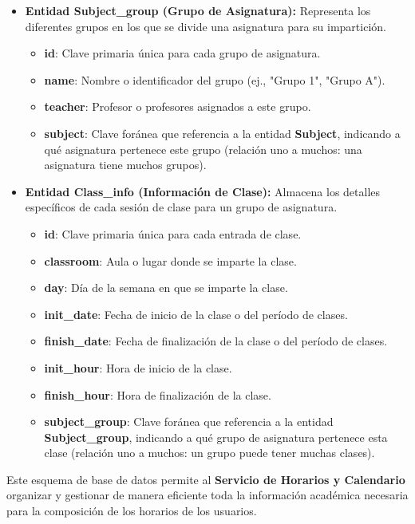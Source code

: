 \begin{itemize}
    \item \textbf{Entidad Subject\_group (Grupo de Asignatura):}
    Representa los diferentes grupos en los que se divide una asignatura para su impartición.
    \begin{itemize}
        \item \textbf{id}: Clave primaria única para cada grupo de asignatura.
        \item \textbf{name}: Nombre o identificador del grupo (ej., "Grupo 1", "Grupo A").
        \item \textbf{teacher}: Profesor o profesores asignados a este grupo.
        \item \textbf{subject}: Clave foránea que referencia a la entidad \textbf{Subject}, indicando a qué asignatura pertenece este grupo (relación uno a muchos: una asignatura tiene muchos grupos).
    \end{itemize}

    \item \textbf{Entidad Class\_info (Información de Clase):}
    Almacena los detalles específicos de cada sesión de clase para un grupo de asignatura.
    \begin{itemize}
        \item \textbf{id}: Clave primaria única para cada entrada de clase.
        \item \textbf{classroom}: Aula o lugar donde se imparte la clase.
        \item \textbf{day}: Día de la semana en que se imparte la clase.
        \item \textbf{init\_date}: Fecha de inicio de la clase o del período de clases.
        \item \textbf{finish\_date}: Fecha de finalización de la clase o del período de clases.
        \item \textbf{init\_hour}: Hora de inicio de la clase.
        \item \textbf{finish\_hour}: Hora de finalización de la clase.
        \item \textbf{subject\_group}: Clave foránea que referencia a la entidad \textbf{Subject\_group}, indicando a qué grupo de asignatura pertenece esta clase (relación uno a muchos: un grupo puede tener muchas clases).
    \end{itemize}
\end{itemize}

Este esquema de base de datos permite al \textbf{Servicio de Horarios y Calendario} organizar y gestionar de manera eficiente toda la información académica necesaria para la composición de los horarios de los usuarios.

